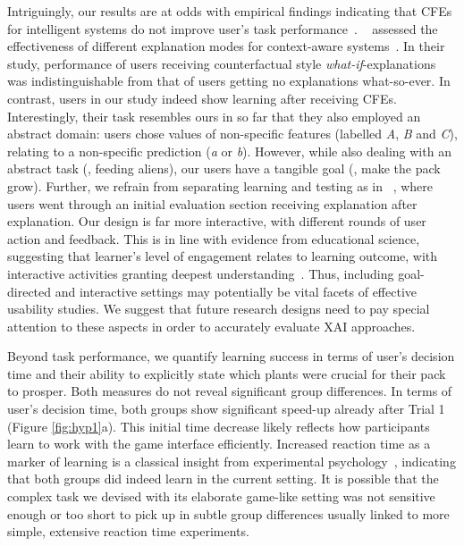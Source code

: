 Intriguingly, our results are at odds with empirical findings indicating that \glspl{CFE} for intelligent systems do not improve user's task performance~\citep{lim_why_2009, van_der_waa_evaluating_2021}.
~\citeauthor{lim_why_2009} assessed the effectiveness of different explanation modes for context-aware systems~\citep{lim_why_2009}. 
In their study, performance of users receiving counterfactual style \textit{what-if}-explanations was indistinguishable from that of users getting no explanations what-so-ever.
In contrast, users in our study indeed show learning after receiving \glspl{CFE}.
Interestingly, their task resembles ours in so far that they also employed an abstract domain: users chose values of non-specific features (labelled \textit{A}, \textit{B} and \textit{C}), relating to a non-specific prediction (\textit{a} or \textit{b}).
However, while also dealing with an abstract task (\ie, feeding aliens), our users have a tangible goal (\ie, make the pack grow).
Further, we refrain from separating learning and testing as in ~\citeauthor{lim_why_2009}, where users went through an initial evaluation section receiving explanation after explanation.
Our design is far more interactive, with different rounds of user action and feedback.
This is in line with evidence from educational science, suggesting that learner's level of engagement relates to learning outcome, with interactive activities granting deepest understanding~\citep{chi_icap_2014}.
Thus, including goal-directed and interactive settings may potentially be vital facets of effective usability studies. 
We suggest that future research designs need to pay special attention to these aspects in order to accurately evaluate \gls{XAI} approaches.

Beyond task performance, we quantify learning success in terms of user's decision time and their ability to explicitly state which plants were crucial for their pack to prosper. %
Both measures do not reveal significant group differences.
In terms of user's decision time, both groups show significant speed-up already after Trial 1 (Figure \ref{fig:hyp1}a).
This initial time decrease likely reflects how participants learn to work with the game interface efficiently.
Increased reaction time as a marker of learning is a classical insight from experimental psychology~\citep{logan_shapes_1992}, indicating that both groups did indeed learn in the current setting. 
It is possible that the complex task we devised with its elaborate game-like setting was not sensitive enough or too short to pick up in subtle group differences usually linked to more simple, extensive reaction time experiments.

